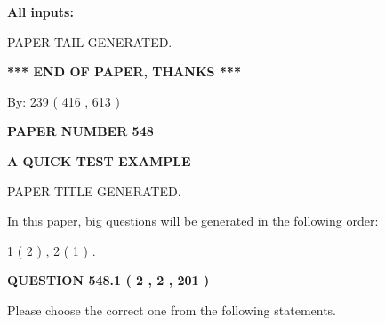 \documentclass[12pt]{article}
\begin{document}
   
\noindent{}
   
   
   
   
\noindent\vspace{0.1in}\hspace{-0.08in} {\textbf{\Large{All inputs: }}}
   
   
   
   
   
   
 \vspace{0.2in}
 
   
   
\vspace{2.0in} PAPER TAIL GENERATED.
   
   
   
   
\vspace{1.0in} 
{\textbf{\large{ *** END OF PAPER, THANKS *** }}} 
   
   
\hspace{1.0in} By: 
 239 ( 416 ,  613 )
   
   
   
   
\newpage 
\setcounter{page}{ 
   548001 } 
   
   
   
   
 {\textbf{ \Large{ PAPER NUMBER  548  }}}
   
   
\vspace{0.2in}
   
   
   
   
   
   
   
   
 \vspace{0.2in}
{\LARGE {\textbf{ A QUICK TEST EXAMPLE}}}
   
   
 PAPER TITLE GENERATED.
   
   
   
\vspace{0.2in}
   
In this paper, big questions will be generated in the following order: 
   
   
   1 ( 2 )
 ,
   2 ( 1 )
 .
  
\vspace{0.2in}
  
{\textbf{\Large{QUESTION
548.1 
 ( 2 , 2 , 201 )
}}}
  
  
Please choose the correct one from the following statements.
 
\end{document}
